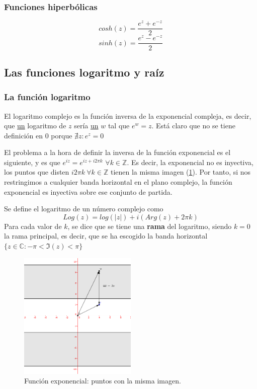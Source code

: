 \documentclass[paper=a4, fontsize=11pt]{scrartcl}
\numberwithin{equation}{section}
\numberwithin{figure}{section}
\numberwithin{table}{section}
\begin{document}
\subsubsection{Funciones hiperbólicas}
$$cosh(z) = \frac{e^z+e^{-z}}{2}$$
$$sinh(z) = \frac{e^z-e^{-z}}{2}$$

\subsection{Las funciones logaritmo y raíz}

\subsubsection{La función logaritmo}
El logaritmo complejo es la función inversa de la exponencial compleja, es decir, que \underline{un} logaritmo de $z$ sería \underline{un} $w$ tal que $e^w = z$. Está claro que no se tiene definición en $0$ porque $\nexists z: e^z=0$

El problema a la hora de definir la inversa de la función exponencial es el siguiente, y es que $e^{iz} = e^{iz+i2\pi k}$ $\forall k\in \mathbb{Z}$. Es decir, la exponencial no es inyectiva, los puntos que disten $i2\pi k\ \forall{k}\in \mathbb{Z}$ tienen la misma imagen (\ref{fig:log}). Por tanto, si nos restringimos a cualquier banda horizontal en el plano complejo, la función exponencial es inyectiva sobre ese conjunto de partida.

Se define el logaritmo de un número complejo como
$$\boxed{Log(z) = log(|z|)+i(Arg(z)+2\pi k)}$$
Para cada valor de $k$, se dice que se tiene una \textbf{rama} del logaritmo, siendo $k=0$ la rama principal, es decir, que se ha escogido la banda horizontal $\{z\in\mathbb{C}: -\pi < \Im (z) < \pi\}$

\begin{figure}[htbp]
\centering
\includegraphics[width=0.5\textwidth]{log.png}
\caption{Función exponencial: puntos con la misma imagen.}
\label{fig:log}
\end{figure}
\end{document}
